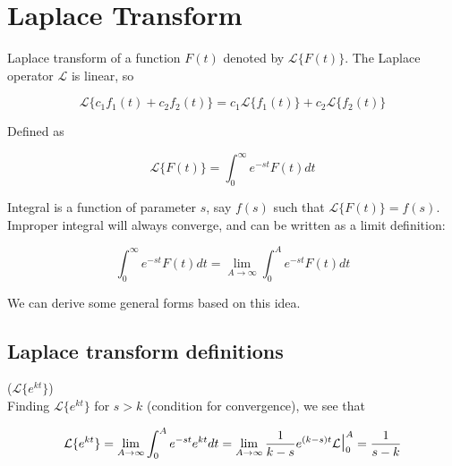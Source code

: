 \section{Laplace Transform}

Laplace transform of a function $F(t)$ denoted by $\mathcal{L}\{F(t)\}$. The Laplace operator $\mathcal{L}$ is linear, so

\begin{equation*}
    \mathcal{L}\{c_1f_1(t)+c_2f_2(t)\}=c_1\mathcal{L}\{f_1(t)\}+c_2\mathcal{L}\{f_2(t)\}
\end{equation*}

Defined as

\begin{equation*}
    \mathcal{L}\{F(t)\}=\int_0^\infty e^{-st}F(t)dt
\end{equation*}

Integral is a function of parameter $s$, say $f(s)$ such that $\mathcal{L}\{F(t)\}=f(s)$.
Improper integral will always converge, and can be written as a limit definition:

\begin{equation*}
    \int_0^\infty e^{-st}F(t)dt=\lim_{A\to \infty}\int_0^Ae^{-st}F(t)dt
\end{equation*}

We can derive some general forms based on this idea.

\subsection{Laplace transform definitions}

\begin{definition}($\mathcal{L}\{e^{kt}\}$)\\
    Finding $\mathcal{L}\{e^{kt}\}$ for $s>k$ (condition for convergence), we see that 

    \begin{equation*}
        \mathcal{L}\{e^{kt}\}=\lim_{A\to\infty} \int_0^A e^{-st}e^{kt}dt=\lim_{A\to\infty}\frac{1}{k-s}e^{(k-s)t}\mbox{$\mathcal{L}$\Large$\mid$}_0^A=\frac{1}{s-k}
    \end{equation*}
\end{definition}

